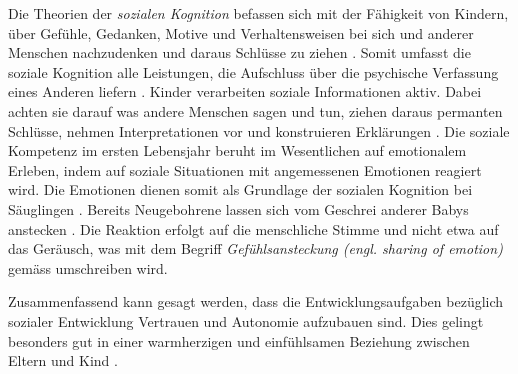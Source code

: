 Die Theorien der \textit{sozialen Kognition} befassen sich mit der Fähigkeit von Kindern, über Gefühle, Gedanken, Motive und Verhaltensweisen bei sich und anderer Menschen nachzudenken und daraus Schlüsse zu ziehen \cite[S.~486ff]{Siegler2008}. Somit umfasst die soziale Kognition alle Leistungen, die Aufschluss über die psychische Verfassung eines Anderen liefern \cite[S.~237ff]{Bischof2011}. Kinder verarbeiten soziale Informationen aktiv. Dabei achten sie darauf was andere Menschen sagen und tun, ziehen daraus permanten Schlüsse, nehmen Interpretationen vor und konstruieren Erklärungen \cite{Siegler2008}. Die soziale Kompetenz im ersten Lebensjahr beruht im Wesentlichen auf emotionalem Erleben, indem auf soziale Situationen mit angemessenen Emotionen reagiert wird. Die Emotionen dienen somit als Grundlage der sozialen Kognition bei Säuglingen \cite{Bischof2011}. Bereits Neugebohrene lassen sich vom Geschrei anderer Babys anstecken \cite{Simner1971}. Die Reaktion erfolgt auf die menschliche Stimme und nicht etwa auf das Geräusch, was mit dem Begriff \textit{Gefühlsansteckung (engl. sharing of emotion)} gemäss  umschreiben wird.

Zusammenfassend kann gesagt werden, dass die Entwicklungsaufgaben bezüglich sozialer Entwicklung Vertrauen und Autonomie aufzubauen sind. Dies gelingt besonders gut in einer warmherzigen und einfühlsamen Beziehung zwischen Eltern und Kind \cite[S.~224]{Berk2011}.


